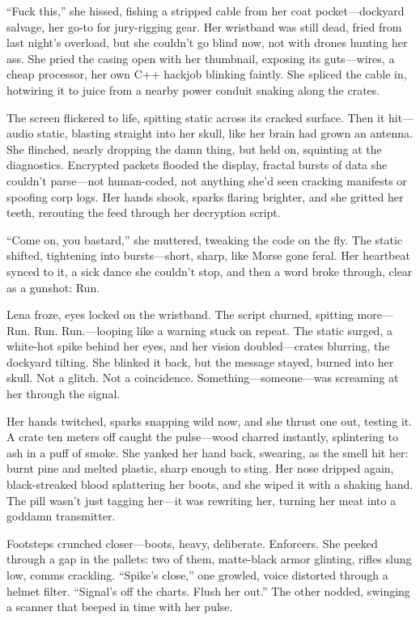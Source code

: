 \documentclass[12pt]{book}
\begin{document}
``Fuck this,'' she hissed, fishing a stripped cable from her coat pocket---dockyard salvage, her go-to for jury-rigging gear. Her wristband was still dead, fried from last night’s overload, but she couldn’t go blind now, not with drones hunting her ass. She pried the casing open with her thumbnail, exposing its guts---wires, a cheap processor, her own C++ hackjob blinking faintly. She spliced the cable in, hotwiring it to juice from a nearby power conduit snaking along the crates.

The screen flickered to life, spitting static across its cracked surface. Then it hit---audio static, blasting straight into her skull, like her brain had grown an antenna. She flinched, nearly dropping the damn thing, but held on, squinting at the diagnostics. Encrypted packets flooded the display, fractal bursts of data she couldn’t parse---not human-coded, not anything she’d seen cracking manifests or spoofing corp logs. Her hands shook, sparks flaring brighter, and she gritted her teeth, rerouting the feed through her decryption script.

``Come on, you bastard,'' she muttered, tweaking the code on the fly. The static shifted, tightening into bursts---short, sharp, like Morse gone feral. Her heartbeat synced to it, a sick dance she couldn’t stop, and then a word broke through, clear as a gunshot: Run.

Lena froze, eyes locked on the wristband. The script churned, spitting more---Run. Run. Run.---looping like a warning stuck on repeat. The static surged, a white-hot spike behind her eyes, and her vision doubled---crates blurring, the dockyard tilting. She blinked it back, but the message stayed, burned into her skull. Not a glitch. Not a coincidence. Something---someone---was screaming at her through the signal.

Her hands twitched, sparks snapping wild now, and she thrust one out, testing it. A crate ten meters off caught the pulse---wood charred instantly, splintering to ash in a puff of smoke. She yanked her hand back, swearing, as the smell hit her: burnt pine and melted plastic, sharp enough to sting. Her nose dripped again, black-streaked blood splattering her boots, and she wiped it with a shaking hand. The pill wasn’t just tagging her---it was rewriting her, turning her meat into a goddamn transmitter.

Footsteps crunched closer---boots, heavy, deliberate. Enforcers. She peeked through a gap in the pallets: two of them, matte-black armor glinting, rifles slung low, comms crackling. ``Spike’s close,'' one growled, voice distorted through a helmet filter. ``Signal’s off the charts. Flush her out.'' The other nodded, swinging a scanner that beeped in time with her pulse.
\end{document}
